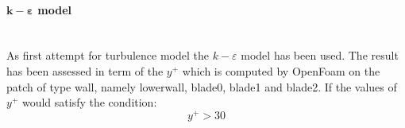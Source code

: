 \documentclass[a4paper,12pt]{article}
\newcommand{\foam}[1]{{\ttfamily #1}}
\newcommand{\kepsilon}{$k\!-\!\varepsilon $ }
\begin{document}
\begin{figure}[H]
\centering
{}
\end{figure}


\paragraph{$\bm{k}-\bm{\varepsilon}$ model}  \mbox{}\\
As first attempt for turbulence model the \kepsilon model has been used.
The result has been assessed in term of the $y^+ $ which is computed by OpenFoam on the patch of type \foam{wall}, namely \foam{lowerwall}, \foam{blade0}, \foam{blade1} and \foam{blade2}.
If the values of $y^+ $ would satisfy the condition:
\begin{equation}
y^+ > 30
\end{equation}
\end{document}
